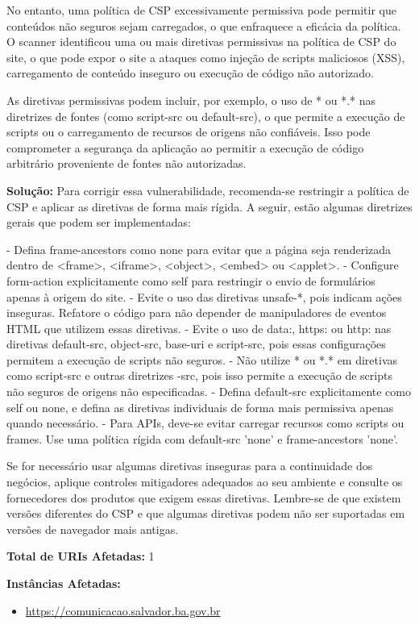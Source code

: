 \documentclass[a4paper,12pt]{article}
\begin{document}
\begin{enumerate}
No entanto, uma política de CSP excessivamente permissiva pode permitir que conteúdos não seguros sejam carregados, o que enfraquece a eficácia da política. O scanner identificou uma ou mais diretivas permissivas na política de CSP do site, o que pode expor o site a ataques como injeção de scripts maliciosos (XSS), carregamento de conteúdo inseguro ou execução de código não autorizado.

As diretivas permissivas podem incluir, por exemplo, o uso de * ou *.* nas diretrizes de fontes (como script-src ou default-src), o que permite a execução de scripts ou o carregamento de recursos de origens não confiáveis. Isso pode comprometer a segurança da aplicação ao permitir a execução de código arbitrário proveniente de fontes não autorizadas.

\textbf{Solução:} Para corrigir essa vulnerabilidade, recomenda-se restringir a política de CSP e aplicar as diretivas de forma mais rígida. A seguir, estão algumas diretrizes gerais que podem ser implementadas:

- Defina frame-ancestors como none para evitar que a página seja renderizada dentro de <frame>, <iframe>, <object>, <embed> ou <applet>.
- Configure form-action explicitamente como self para restringir o envio de formulários apenas à origem do site.
- Evite o uso das diretivas unsafe-*, pois indicam ações inseguras. Refatore o código para não depender de manipuladores de eventos HTML que utilizem essas diretivas.
- Evite o uso de data:, https: ou http: nas diretivas default-src, object-src, base-uri e script-src, pois essas configurações permitem a execução de scripts não seguros.
- Não utilize * ou *.* em diretivas como script-src e outras diretrizes -src, pois isso permite a execução de scripts não seguros de origens não especificadas.
- Defina default-src explicitamente como self ou none, e defina as diretivas individuais de forma mais permissiva apenas quando necessário.
- Para APIs, deve-se evitar carregar recursos como scripts ou frames. Use uma política rígida com default-src 'none' e frame-ancestors 'none'.

Se for necessário usar algumas diretivas inseguras para a continuidade dos negócios, aplique controles mitigadores adequados ao seu ambiente e consulte os fornecedores dos produtos que exigem essas diretivas. Lembre-se de que existem versões diferentes do CSP e que algumas diretivas podem não ser suportadas em versões de navegador mais antigas.

\textbf{Total de URIs Afetadas:} 1

\textbf{Instâncias Afetadas:}
\begin{itemize}
    \item \url{https://comunicacao.salvador.ba.gov.br}
\end{itemize}

\end{enumerate}
\end{document}
